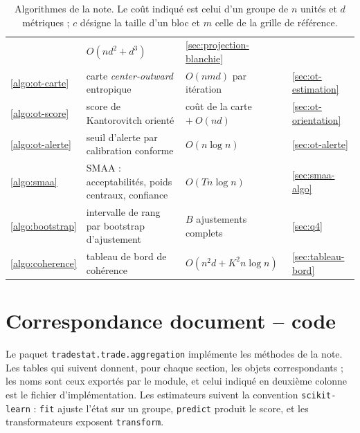 \documentclass[11pt,a4paper]{article}
\theoremstyle{definition}
\theoremstyle{remark}
\begin{document}
\begin{table}[htbp]
\begin{tabularx}{\textwidth}{@{}l Y l l@{}}
      & $O(nd^2 + d^3)$ & \ref{sec:projection-blanchie} \\
    \ref{algo:ot-carte} & carte \emph{center-outward} entropique
      & $O(nm d)$ par itération & \ref{sec:ot-estimation} \\
    \ref{algo:ot-score} & score de Kantorovitch orienté
      & coût de la carte $+\ O(nd)$ & \ref{sec:ot-orientation} \\
    \ref{algo:ot-alerte} & seuil d'alerte par calibration conforme
      & $O(n\log n)$ & \ref{sec:ot-alerte} \\
    \ref{algo:smaa} & SMAA : acceptabilités, poids centraux, confiance
      & $O(Tn\log n)$ & \ref{sec:smaa-algo} \\
    \ref{algo:bootstrap} & intervalle de rang par bootstrap d'ajustement
      & $B$ ajustements complets & \ref{sec:q4} \\
    \ref{algo:coherence} & tableau de bord de cohérence
      & $O(n^2 d + K^2 n\log n)$ & \ref{sec:tableau-bord} \\
    \bottomrule
  \end{tabularx}
  \caption{Algorithmes de la note. Le coût indiqué est celui d'un groupe de $n$ unités et
  $d$ métriques ; $c$ désigne la taille d'un bloc et $m$ celle de la grille de référence.}
  \label{tab:algos-recap}
\end{table}

\section{Correspondance document -- code}
\label{app:code}

\medskip

\begin{sloppypar}
Le paquet \texttt{tradestat.trade.aggregation} implémente les méthodes de la note. Les
tables qui suivent donnent, pour chaque section, les objets correspondants ; les noms sont
ceux exportés par le module, et celui indiqué en deuxième colonne est le fichier
d'implémentation. Les estimateurs suivent la convention \texttt{scikit-learn} :
\texttt{fit} ajuste l'état sur un groupe, \texttt{predict} produit le score, et les
transformateurs exposent \texttt{transform}.
\end{sloppypar}

\medskip
\end{document}
